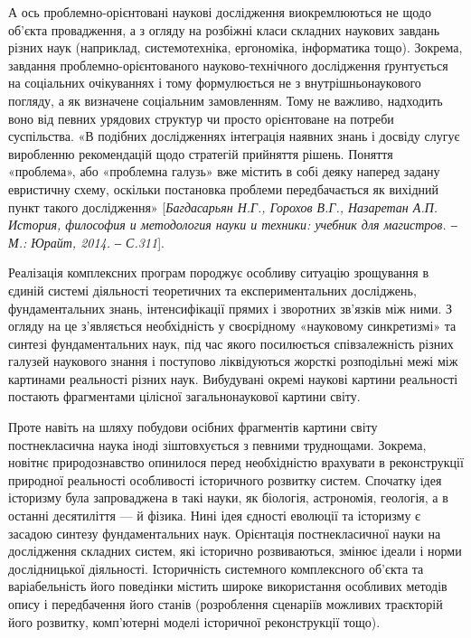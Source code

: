 А ось проблемно-орієнтовані наукові дослідження виокремлюються не
щодо об’єкта провадження, а з огляду на розбіжні класи складних наукових
завдань різних наук (наприклад, системотехніка, ергономіка, інформатика
тощо). Зокрема, завдання проблемно-орієнтованого науково-технічного
дослідження ґрунтується на соціальних очікуваннях і тому формулюється не з
внутрішньонаукового погляду, а як визначене соціальним замовленням. Тому
не важливо, надходить воно від певних урядових структур чи просто
орієнтоване на потреби суспільства. «В подібних дослідженнях інтеграція
наявних знань і досвіду слугує виробленню рекомендацій щодо стратегій
прийняття рішень. Поняття «проблема», або «проблемна галузь» вже містить в
собі деяку наперед задану евристичну схему, оскільки постановка проблеми
передбачається як вихідний пункт такого дослідження» [\textit{Багдасарьян Н.Г.,
Горохов В.Г., Назаретан А.П. История, философия и методология науки и
техники: учебник для магистров. ‒ М.: Юрайт, 2014. ‒ С.311}].

Реалізація комплексних програм породжує особливу ситуацію зрощування в
єдиній системі діяльності теоретичних та експериментальних досліджень,
фундаментальних знань, інтенсифікації прямих і зворотних зв’язків між ними. З
огляду на це з’являється необхідність у своєрідному «науковому синкретизмі»
та синтезі фундаментальних наук, під час якого посилюється співзалежність
різних галузей наукового знання і поступово ліквідуються жорсткі розподільні
межі між картинами реальності різних наук. Вибудувані окремі наукові картини
реальності постають фрагментами цілісної загальнонаукової картини світу.

Проте навіть на шляху побудови осібних фрагментів картини світу
постнекласична наука іноді зіштовхується з певними труднощами. Зокрема,
новітнє природознавство опинилося перед необхідністю врахувати в
реконструкції природної реальності особливості історичного розвитку систем.
Спочатку ідея історизму була запроваджена в такі науки, як біологія,
астрономія, геологія, а в останні десятиліття --- й фізика. Нині ідея єдності
еволюції та історизму є засадою синтезу фундаментальних наук. Орієнтація
постнекласичної науки на дослідження складних систем, які історично
розвиваються, змінює ідеали і норми дослідницької діяльності. Історичність
системного комплексного об’єкта та варіабельність його поведінки містить
широке використання особливих методів опису і передбачення його станів
(розроблення сценаріїв можливих траєкторій його розвитку, комп’ютерні
моделі історичної реконструкції тощо).

